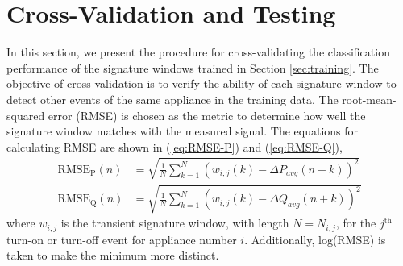 \documentclass[conference]{IEEEtran}
\begin{document}
%





\section{Cross-Validation and Testing}\label{sec:cv}
In this section, we present the procedure for cross-validating the classification performance of the signature windows trained in Section \ref{sec:training}.  The objective of cross-validation is to verify the ability of each signature window to detect other events of the same appliance in the training data.  The root-mean-squared error (RMSE) is chosen as the metric to determine how well the signature window matches with the measured signal.  The equations for calculating RMSE are shown in (\ref{eq:RMSE-P}) and (\ref{eq:RMSE-Q}),
\begin{align}
\label{eq:RMSE-P}
\text{RMSE}_{\text{P}}(n) &= \sqrt{\frac{1}{N}\sum\limits_{k=1}^{N}(w_{i,j}(k) - \Delta P_{avg}(n+k))^2}\\
\label{eq:RMSE-Q}
\text{RMSE}_{\text{Q}}(n) &= \sqrt{\frac{1}{N}\sum\limits_{k=1}^{N}(w_{i,j}(k) - \Delta Q_{avg}(n+k))^2}
\end{align}
where $w_{i,j}$ is the transient signature window, with length $N = N_{i,j}$, for the $j^{\text{th}}$ turn-on or turn-off event for appliance number $i$.  Additionally, log(RMSE) is taken to make the minimum more distinct.  
\end{document}
